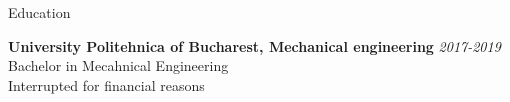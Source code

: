 \documentclass[
	11pt, %
]{resume} %
\begin{document}

\begin{rSection}{Education}

	\textbf{University Politehnica of Bucharest, Mechanical engineering} \hfill \textit{2017-2019} \\
	Bachelor in Mecahnical Engineering \\
	Interrupted for financial reasons

\end{rSection}

\end{document}
